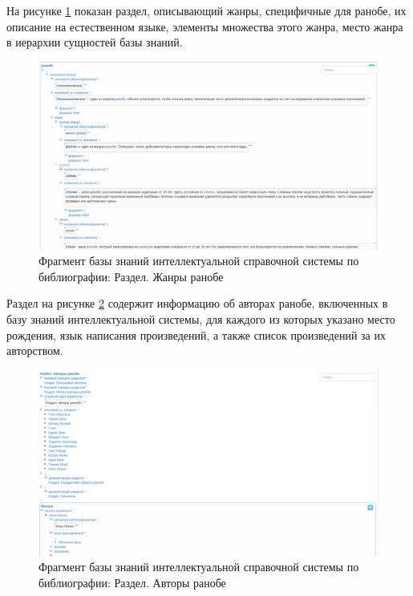 На рисунке \ref{fig:section_genres} показан раздел, описывающий жанры, специфичные для ранобе, их описание на естественном языке, элементы множества этого жанра, место жанра в иерархии сущностей базы знаний.

\begin{figure}[H]
    \centering
    \includegraphics[scale=0.41,trim={0 5cm 0 0},clip]{imgs/genres.png}
    \caption{Фрагмент базы знаний интеллектуальной справочной системы по библиографии: Раздел. Жанры ранобе}
    \label{fig:section_genres}
\end{figure}


Раздел на рисунке \ref{fig:authors} содержит информацию об авторах ранобе, включенных в базу знаний интеллектуальной системы, для каждого из которых указано место рождения, язык написания произведений, а также список произведений за их авторством.

\begin{figure}[H]
    \centering
    \includegraphics[scale=0.4]{imgs/authors.png}
    \caption{Фрагмент базы знаний интеллектуальной справочной системы по библиографии: Раздел. Авторы ранобе}
    \label{fig:authors}
\end{figure}

